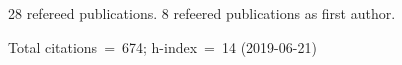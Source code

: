 28 refereed publications. 8 refeered publications as first author.

Total citations~=~674; h-index~=~14 (2019-06-21)